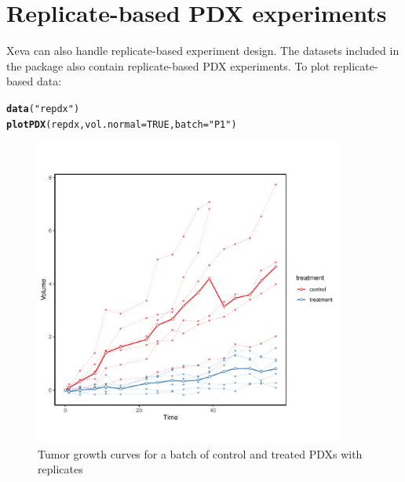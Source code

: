 \documentclass{article}\usepackage[]{graphicx}\usepackage[]{xcolor}
\makeatletter
\newcommand{\hlnum}[1]{\textcolor[rgb]{0.686,0.059,0.569}{#1}}%
\newcommand{\hlstr}[1]{\textcolor[rgb]{0.192,0.494,0.8}{#1}}%
\newcommand{\hlstd}[1]{\textcolor[rgb]{0.345,0.345,0.345}{#1}}%
\newcommand{\hlkwc}[1]{\textcolor[rgb]{0.333,0.667,0.333}{#1}}%
\newcommand{\hlkwd}[1]{\textcolor[rgb]{0.737,0.353,0.396}{\textbf{#1}}}%
\newenvironment{kframe}{%
 \def\at@end@of@kframe{}%
 \ifinner\ifhmode%
  \def\at@end@of@kframe{\end{minipage}}%
  \begin{minipage}{\columnwidth}%
 \fi\fi%
 \def\FrameCommand##1{\hskip\@totalleftmargin \hskip-\fboxsep
 \colorbox{shadecolor}{##1}\hskip-\fboxsep
     \hskip-\linewidth \hskip-\@totalleftmargin \hskip\columnwidth}%
 \MakeFramed {\advance\hsize-\width
   \@totalleftmargin\z@ \linewidth\hsize
   \@setminipage}}%
 {\par\unskip\endMakeFramed%
 \at@end@of@kframe}
\newenvironment{knitrout}{}{} %
\makeatother
\begin{document}
\section{Replicate-based PDX experiments}
Xeva can also handle replicate-based experiment design. The datasets included in the package also contain replicate-based PDX experiments. To plot replicate-based data:
\begin{knitrout}
\color{fgcolor}\begin{kframe}
\begin{alltt}
\hlkwd{data}\hlstd{(}\hlstr{"repdx"}\hlstd{)}
\hlkwd{plotPDX}\hlstd{(repdx,} \hlkwc{vol.normal} \hlstd{=} \hlnum{TRUE}\hlstd{,} \hlkwc{batch} \hlstd{=} \hlstr{"P1"}\hlstd{)}
\end{alltt}
\end{kframe}\begin{figure}
\includegraphics[width=4in]{figure/repplot1-1} \caption[Tumor growth curves for a batch of control and treated PDXs with replicates]{Tumor growth curves for a batch of control and treated PDXs with replicates}\label{fig:repplot1}
\end{figure}

\end{knitrout}
\end{document}
